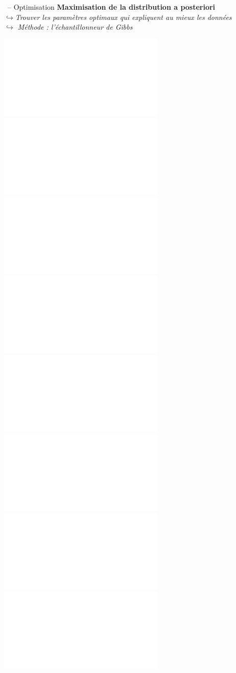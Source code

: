 \documentclass[10pt,xcolor=x11names,compress, show notes]{beamer}%
\begin{document}
\newlength{\wg} \setlength{\wg}{0.4\textwidth}
\begin{frame}{\insertsectionhead~-- Optimisation}
\textbf{Maximisation de la distribution a posteriori}\\
{\itshape $\hookrightarrow$Trouver les paramètres optimaux  qui expliquent au mieux les données\\
$\hookrightarrow$ Méthode : l'échantillonneur de Gibbs}
\vfill
\begin{overlayarea}{\textwidth}{0.5\textheight}
\centering
\includegraphics<4>[trim=-1.66cm 0 0 0, clip,height=\wg,angle=-90]{model2.pdf}
\includegraphics<5>[trim=-1.66cm 0 0 0, clip,height=\wg,angle=-90]{model0.pdf}
\includegraphics<6>[trim=-1.66cm 0 0 0, clip,height=\wg,angle=-90]{model3.pdf}
\includegraphics<7>[trim=-1.66cm 0 0 0, clip,height=\wg,angle=-90]{model4.pdf}
\includegraphics<8>[trim=-1.66cm 0 0 0, clip,height=\wg,angle=-90]{model5.pdf}
\includegraphics<9>[trim=-1.66cm 0 0 0, clip,height=\wg,angle=-90]{model6.pdf}
\includegraphics<10>[trim=-1.66cm 0 0 0, clip,height=\wg,angle=-90]{model7.pdf}
\includegraphics<11->[height=\wg+0.002\textwidth,angle=-90]{model8.pdf}
\end{overlayarea}
\vfill
{}
\end{frame}
\end{document}
